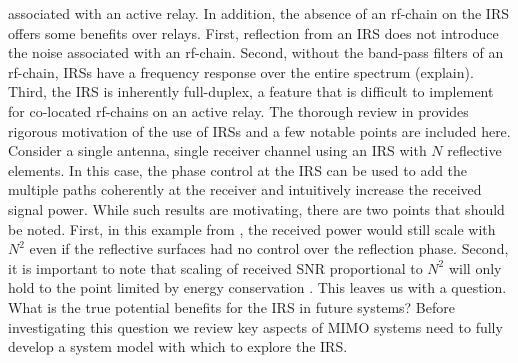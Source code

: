 associated with an active relay. In addition, the absence of an rf-chain on the IRS offers some benefits over relays. First, reflection from an IRS does not introduce the noise associated with an rf-chain. Second, without the band-pass filters of an rf-chain, IRSs have a frequency response over the entire spectrum (explain). Third, the IRS is inherently full-duplex, a feature that is difficult to implement for co-located rf-chains on an active relay. 
The thorough review in \cite{basar2019wireless} provides rigorous motivation of the use of IRSs and a few notable points are included here.
Consider a single antenna, single receiver channel using an IRS with $N$ reflective elements. In this case, the phase control at the IRS can be used to add the multiple paths coherently at the receiver and intuitively increase the received signal power. While such results are motivating, there are two points that should be noted. First, in this example from \cite{basar2019wireless}, the received power would still scale with $N^2$ even if the reflective surfaces had no control over the reflection phase. Second, it is important to note that scaling of received SNR proportional to $N^2$ will only hold to the point limited by energy conservation \cite{bjornson2019demystifying}.
This leaves us with a question. What is the true potential benefits for the IRS in future systems?
Before investigating this question we review key aspects of MIMO systems need to fully develop a system model with which to explore the IRS. 